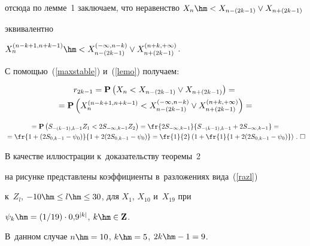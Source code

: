 отсюда по лемме~1 заключаем, что неравенство $X_n\hm<X_{n-(2k-1)}\vee X_{n+(2k-1)}$ 


эквивалентно


$X_n^{(n-k+1,n+k-1)}\hm<X_{n-(2k-1)}^{(-\infty,n-k)}\vee X_{n+(2k-1)}^{(n+k,+\infty)}$.





С помощью~(\ref{maxstable}) и~(\ref{lemo}) получаем:


\begin{multline*}


r_{2k-1}={\bf P}\left(X_n<X_{n-(2k-1)}\vee X_{n+(2k-1)}\right)={}\\


{}=


{\bf P}\left(X_n^{(n-k+1,n+k-1)}<X_{n-(2k-1)}^{(-\infty,n-k)}\vee 


X_{n+(2k-1)}^{(n+k,+\infty)}\right)={}


\end{multline*}





\noindent


\begin{multline*}


{}={\bf P}\left(S_{-(k-1),k-1}Z_1<2S_{-\infty,k-1}Z_2\right)=


\fr{2S_{-\infty,k-1}}{S_{-(k-1),k-1}+2S_{-\infty,k-1}}={}\\


{}=\fr{1+(2S_{0,k-1}-\psi_0)}{1+2(2S_{0,k-1}-\psi_0)}=


\fr{1}{2}\left(1+\fr{1}{1+2(2S_{0,k-1}-\psi_0)}\right)\,.~\square


\end{multline*}








В качестве иллюстрации к~доказательству теоремы~2


на рисунке представлены коэффициенты в~разложениях вида~(\ref{razl})


к~$Z_l$, $-10\hm\le l\hm\le 30$, для $X_1$, $X_{10}$ и~$X_{19}$ при 


$\psi_k\hm=(1/19)\cdot 0{,}9^{|k|}$, $k\hm\in {\bf Z}$.


В~данном случае $n\hm=10$, $k\hm=5$, $2k\hm-1=9$.





